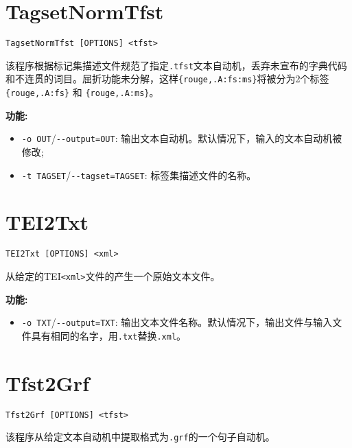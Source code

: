 \section{TagsetNormTfst}
 \verb+TagsetNormTfst [OPTIONS] <tfst>+

\bigskip
\noindent 该程序根据标记集描述文件规范了指定\verb+.tfst+文本自动机，丢弃未宣布的字典代码和不连贯的词目。屈折功能未分解，这样\verb+{rouge,.A:fs:ms}+将被分为2个标签\verb+{rouge,.A:fs}+ 和 \verb+{rouge,.A:ms}+。

\bigskip
\noindent \textbf{功能:}
\begin{itemize}
\item \verb+-o OUT+/\verb+--output=OUT+: 输出文本自动机。默认情况下，输入的文本自动机被修改;
\item \verb+-t TAGSET+/\verb+--tagset=TAGSET+: 标签集描述文件的名称。
\end{itemize}







\section{TEI2Txt} 
\verb+TEI2Txt [OPTIONS] <xml>+

\bigskip
\noindent 从给定的TEI\verb+<xml>+文件的产生一个原始文本文件。

\bigskip
\noindent \textbf{功能:}
\begin{itemize}
  \item \verb+-o TXT+/\verb+--output=TXT+: 输出文本文件名称。默认情况下，输出文件与输入文件具有相同的名字，用\verb+.txt+替换\verb+.xml+。
\end{itemize}







\section{Tfst2Grf}
\verb+Tfst2Grf [OPTIONS] <tfst>+

\bigskip
\noindent 该程序从给定文本自动机中提取格式为\verb+.grf+的一个句子自动机。

